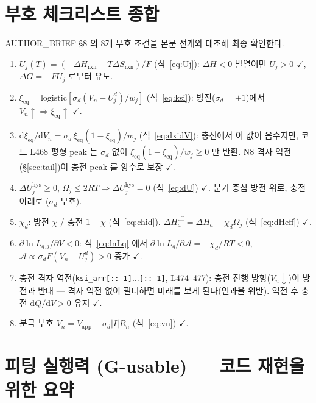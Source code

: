 \documentclass[11pt,a4paper]{article}
\newcommand{\dd}{\mathrm{d}}
\newcommand{\eff}{\mathrm{eff}}
\newcommand{\eq}{\mathrm{eq}}
\newcommand{\app}{\mathrm{app}}
\newcommand{\hys}{\mathrm{hys}}
\begin{document}
\section{부호 체크리스트 종합}\label{sec:sign}

AUTHOR\_BRIEF §8 의 8개 부호 조건을 본문 전개와 대조해 최종 확인한다.

\begin{enumerate}
\item $U_j(T)=(-\Delta H_{\mathrm{rxn}}+T\Delta S_{\mathrm{rxn}})/F$ (식~\eqref{eq:Uj}):
  $\Delta H<0$ 발열이면 $U_j>0$ $\checkmark$, $\Delta G=-FU_j$ 로부터 유도.
\item $\xi_{\eq}=\mathrm{logistic}[\sigma_d(V_n-U_j^d)/w_j]$ (식~\eqref{eq:ksi}):
  방전($\sigma_d=+1$)에서 $V_n\uparrow\Rightarrow\xi_{\eq}\uparrow$ $\checkmark$.
\item $\dd\xi_{\eq}/\dd V_n = \sigma_d\,\xi_{\eq}(1-\xi_{\eq})/w_j$ (식~\eqref{eq:dxidV}):
  충전에서 이 값이 음수지만, 코드 L468 평형 peak 는 $\sigma_d$ 없이
  $\xi_{\eq}(1-\xi_{\eq})/w_j\ge0$ 만 반환. N8 격자 역전(\S\ref{sec:tail})이
  충전 peak 를 양수로 보장 $\checkmark$.
\item $\Delta U_j^\hys\ge0$, $\Omega_j\le2RT\Rightarrow\Delta U_j^\hys=0$ (식~\eqref{eq:dU}) $\checkmark$.
  분기 중심 방전 위로, 충전 아래로 ($\sigma_d$ 부호).
\item $\chi_d$: 방전 $\chi$ / 충전 $1-\chi$ (식~\eqref{eq:chid}).
  $\Delta H_a^\eff=\Delta H_a-\chi_d\Omega_j$ (식~\eqref{eq:dHeff}) $\checkmark$.
\item $\partial\ln L_{q,j}/\partial V < 0$: 식~\eqref{eq:lnLq} 에서
  $\partial\ln L_q/\partial\mathcal{A}=-\chi_d/RT<0$, $\mathcal{A}\propto\sigma_dF(V_n-U_j^d)>0$ 증가 $\checkmark$.
\item 충전 격자 역전(\texttt{ksi\_arr[::-1]$\ldots$[::-1]}, L474--477):
  충전 진행 방향($V_n\downarrow$)이 방전과 반대 — 격자 역전 없이 필터하면
  미래를 보게 된다(인과율 위반). 역전 후 충전 $\dd Q/\dd V>0$ 유지 $\checkmark$.
\item 분극 부호 $V_n=V_\app-\sigma_d|I|R_n$ (식~\eqref{eq:vn}) $\checkmark$.
\end{enumerate}

\section{피팅 실행력 (G-usable) — 코드 재현을 위한 요약}\label{sec:fit}
\end{document}
